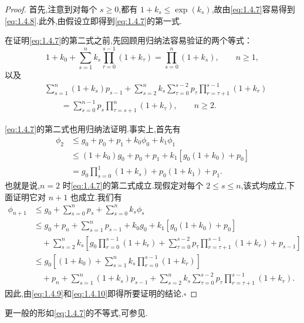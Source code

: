 \begin{proof}
首先,注意到对每个 \(s\ge0\),都有 \(1+k_s\le\exp(k_s)\),故由\eqref{eq:1.4.7}容易得到\eqref{eq:1.4.8}.此外,由假设立即得到\eqref{eq:1.4.7}的第一式.

在证明\eqref{eq:1.4.7}的第二式之前,先回顾用归纳法容易验证的两个等式：
\begin{equation}\label{eq:1.4.9}
  1+k_0+\sum_{s=1}^n k_s\prod_{\tau=0}^{s-1}(1+k_\tau)
  =\prod_{s=0}^n(1+k_s),\qquad n\ge1,
\end{equation}
以及
\begin{equation}\label{eq:1.4.10}
  \begin{aligned}
    &\sum_{s=1}^n(1+k_s)p_{s-1}
    +\sum_{s=2}^n k_s\sum_{\tau=0}^{s-2}p_\tau\prod_{r=\tau+1}^{s-1}(1+k_r)\\
    &\qquad=\sum_{s=0}^{n-1}p_s\prod_{\tau=s+1}^n(1+k_\tau),\qquad n\ge2.
  \end{aligned}
\end{equation}

\eqref{eq:1.4.7}的第二式也用归纳法证明.事实上,首先有
\[
  \begin{aligned}
    \phi_2
    &\le g_0+p_0+p_1+k_0\phi_0+k_1\phi_1\\
    &\le (1+k_0)g_0+p_0+p_1+k_1[g_0(1+k_0)+p_0]\\
    &=g_0\prod_{s=0}^1(1+k_s)+p_0(1+k_1)+p_1.
  \end{aligned}
\]
也就是说,\(n=2\) 时\eqref{eq:1.4.7}的第二式成立.现假定对每个 \(2\le s\le n\),该式均成立,下面证明它对 \(n+1\) 也成立.我们有
\[
  \begin{aligned}
    \phi_{n+1}
    &\le g_0+\sum_{s=0}^n p_s+\sum_{s=0}^n k_s\phi_s\\
    &\le g_0+p_n+\sum_{s=1}^n p_{s-1}+k_0g_0+k_1[g_0(1+k_0)+p_0]\\
    &\quad+\sum_{s=2}^n k_s\left[
      g_0\prod_{r=0}^{s-1}(1+k_r)+
      \sum_{\tau=0}^{s-2}p_\tau\prod_{r=\tau+1}^{s-1}(1+k_r)+p_{s-1}\right]\\
    &\le g_0\left[(1+k_0)+\sum_{s=1}^n k_s\prod_{r=0}^{s-1}(1+k_r)\right]\\
    &\quad+p_n+\sum_{s=1}^n(1+k_s)p_{s-1}+
      \sum_{s=2}^n k_s\sum_{\tau=0}^{s-2}p_\tau\prod_{r=\tau+1}^{s-1}(1+k_r).
  \end{aligned}
\]
因此,由\eqref{eq:1.4.9}和\eqref{eq:1.4.10}即得所要证明的结论.\hfill\(\square\)
\end{proof}

更一般的形如\eqref{eq:1.4.7}的不等式,可参见.
